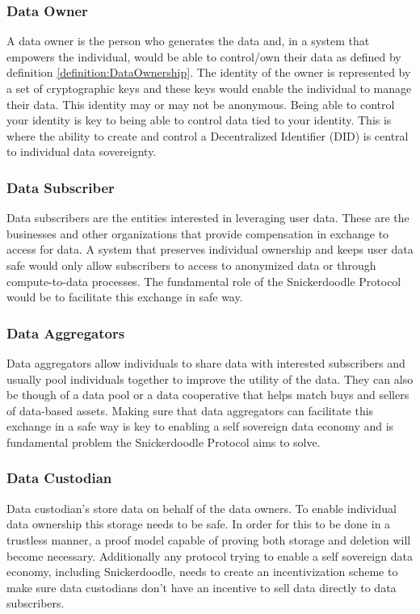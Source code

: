 \subsubsection{Data Owner}
A data owner is the person who generates the data and, in a system that empowers the individual, would be able to control/own their data as defined by definition \ref{definition:DataOwnership}. The identity of the owner is represented by a set of cryptographic keys and these keys would enable the individual to manage their data. This identity may or may not be anonymous.
\newline
\newline
Being able to control your identity is key to being able to control data tied to your identity. This is where the ability to create and control a Decentralized Identifier (DID) is central to individual data sovereignty. 

\subsubsection{Data Subscriber}
Data subscribers are the entities interested in leveraging user data. These are the businesses and other organizations that provide compensation in exchange to access for data. A system that preserves individual ownership and keeps user data safe would only allow subscribers to access to anonymized data or through compute-to-data processes.
\newline
\newline
The fundamental role of the Snickerdoodle Protocol would be to facilitate this exchange in safe way. 

\subsubsection{Data Aggregators}
Data aggregators allow individuals to share data with interested subscribers and usually pool individuals together to improve the utility of the data. They can also be though of a data pool or a data cooperative that helps match buys and sellers of data-based assets.
\newline
\newline
Making sure that data aggregators can facilitate this exchange in a safe way is key to enabling a self sovereign data economy and is fundamental problem the Snickerdoodle Protocol aims to solve.

\subsubsection{Data Custodian}
Data custodian's store data on behalf of the data owners. To enable individual data ownership this storage needs to be safe. In order for this to be done in a trustless manner, a proof model capable of proving both storage and deletion will become necessary. Additionally any protocol trying to enable a self sovereign data economy, including Snickerdoodle, needs to create an incentivization scheme to make sure data custodians don't have an incentive to sell data directly to data subscribers.

